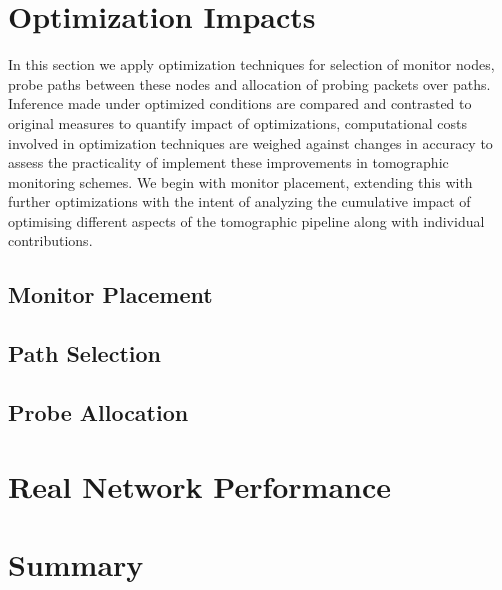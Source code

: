 \section{Optimization Impacts}
\label{sec:Rprobingoptimality}
In this section we apply optimization techniques for selection of monitor nodes, probe paths between these nodes and allocation of probing packets over paths. Inference made under optimized conditions are compared and contrasted to original measures to quantify impact of optimizations, computational costs involved in optimization techniques are weighed against changes in accuracy to assess the practicality of implement these improvements in tomographic monitoring schemes. We begin with monitor placement, extending this with further optimizations with the intent of analyzing the cumulative impact of optimising different aspects of the tomographic pipeline along with individual contributions.
\subsection{Monitor Placement}
\subsection{Path Selection}
\subsection{Probe Allocation}

\section{Real Network Performance}
\label{sec:Rrealnetworkperformance}

\section{Summary}
